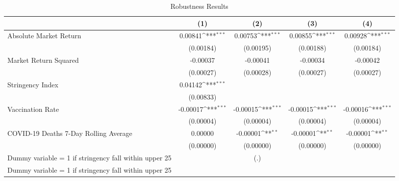 \begin{table}[htbp]\centering
\def\sym#1{\ifmmode^{#1}\else\(^{#1}\)\fi}
\caption{Robustness Results \label{reg2}}
\begin{tabular}{l*{4}{c}}
\toprule
                    &\multicolumn{1}{c}{(1)}         &\multicolumn{1}{c}{(2)}         &\multicolumn{1}{c}{(3)}         &\multicolumn{1}{c}{(4)}         \\
\midrule
Absolute Market Return&     0.00841\sym{***}&     0.00753\sym{***}&     0.00855\sym{***}&     0.00928\sym{***}\\
                    &   (0.00184)         &   (0.00195)         &   (0.00188)         &   (0.00184)         \\
\addlinespace
Market Return Squared&    -0.00037         &    -0.00041         &    -0.00034         &    -0.00042         \\
                    &   (0.00027)         &   (0.00028)         &   (0.00027)         &   (0.00027)         \\
\addlinespace
Stringency Index    &     0.04142\sym{***}&                     &                     &                     \\
                    &   (0.00833)         &                     &                     &                     \\
\addlinespace
Vaccination Rate    &    -0.00017\sym{***}&    -0.00015\sym{***}&    -0.00015\sym{***}&    -0.00016\sym{***}\\
                    &   (0.00004)         &   (0.00004)         &   (0.00004)         &   (0.00004)         \\
\addlinespace
COVID-19 Deaths 7-Day Rolling Average&     0.00000         &    -0.00001\sym{**} &    -0.00001\sym{**} &    -0.00001\sym{**} \\
                    &   (0.00000)         &   (0.00000)         &   (0.00000)         &   (0.00000)         \\
\addlinespace
Dummy variable = 1 if stringency fall within upper 25%
                    &                     &         (.)         &                     &                     \\
\addlinespace
Dummy variable = 1 if stringency fall within upper 25%

\end{tabular}
\end{table}
